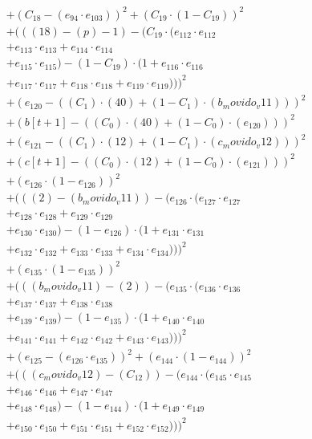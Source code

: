 \documentclass[10pt, a4paper]{article}
\begin{document}
\begin{align*}
& + (C_{18} - (e_{94} \cdot e_{103}))^{2} + (C_{19} \cdot (1 - C_{19}))^{2} \\
& + (((18) - (p) - 1) - (C_{19} \cdot (e_{112} \cdot e_{112} \\
& + e_{113} \cdot e_{113} + e_{114} \cdot e_{114} \\
& + e_{115} \cdot e_{115}) - (1 - C_{19}) \cdot (1 + e_{116} \cdot e_{116} \\
& + e_{117} \cdot e_{117} + e_{118} \cdot e_{118} + e_{119} \cdot e_{119})))^{2} \\
& + (e_{120} - ((C_{1})  \cdot  (40) + (1 - C_{1})  \cdot  (b_movido_v11)))^{2} \\
& + (b[t+1] - ((C_{0})  \cdot  (40) + (1 - C_{0})  \cdot  (e_{120})))^{2} \\
& + (e_{121} - ((C_{1})  \cdot  (12) + (1 - C_{1})  \cdot  (c_movido_v12)))^{2} \\
& + (c[t+1] - ((C_{0})  \cdot  (12) + (1 - C_{0})  \cdot  (e_{121})))^{2} \\
& + (e_{126} \cdot (1 - e_{126}))^{2} \\
& + (((2) - (b_movido_v11)) - (e_{126} \cdot (e_{127} \cdot e_{127} \\
& + e_{128} \cdot e_{128} + e_{129} \cdot e_{129} \\
& + e_{130} \cdot e_{130}) - (1 - e_{126}) \cdot (1 + e_{131} \cdot e_{131} \\
& + e_{132} \cdot e_{132} + e_{133} \cdot e_{133} + e_{134} \cdot e_{134})))^{2} \\
& + (e_{135} \cdot (1 - e_{135}))^{2} \\
& + (((b_movido_v11) - (2)) - (e_{135} \cdot (e_{136} \cdot e_{136} \\
& + e_{137} \cdot e_{137} + e_{138} \cdot e_{138} \\
& + e_{139} \cdot e_{139}) - (1 - e_{135}) \cdot (1 + e_{140} \cdot e_{140} \\
& + e_{141} \cdot e_{141} + e_{142} \cdot e_{142} + e_{143} \cdot e_{143})))^{2} \\
& + (e_{125} - (e_{126} \cdot e_{135}))^{2} + (e_{144} \cdot (1 - e_{144}))^{2} \\
& + (((c_movido_v12) - (C_{12})) - (e_{144} \cdot (e_{145} \cdot e_{145} \\
& + e_{146} \cdot e_{146} + e_{147} \cdot e_{147} \\
& + e_{148} \cdot e_{148}) - (1 - e_{144}) \cdot (1 + e_{149} \cdot e_{149} \\
& + e_{150} \cdot e_{150} + e_{151} \cdot e_{151} + e_{152} \cdot e_{152})))^{2} \\

\end{align*}
\end{document}
